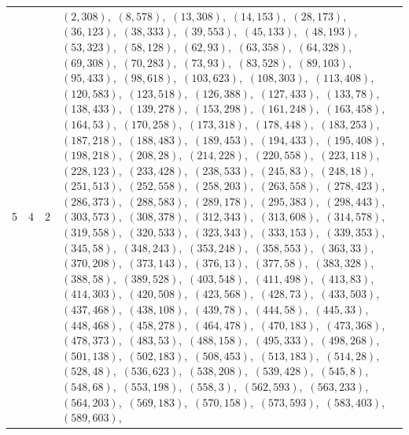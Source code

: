 \documentclass[11pt]{article}
\begin{document}
\begin{longtable}{@{}rrl>{\raggedright\arraybackslash}p{}@{}}
5 & 4 & $2$ & $(2,308)$,\allowbreak\ $(8,578)$,\allowbreak\ $(13,308)$,\allowbreak\ $(14,153)$,\allowbreak\ $(28,173)$,\allowbreak\ $(36,123)$,\allowbreak\ $(38,333)$,\allowbreak\ $(39,553)$,\allowbreak\ $(45,133)$,\allowbreak\ $(48,193)$,\allowbreak\ $(53,323)$,\allowbreak\ $(58,128)$,\allowbreak\ $(62,93)$,\allowbreak\ $(63,358)$,\allowbreak\ $(64,328)$,\allowbreak\ $(69,308)$,\allowbreak\ $(70,283)$,\allowbreak\ $(73,93)$,\allowbreak\ $(83,528)$,\allowbreak\ $(89,103)$,\allowbreak\ $(95,433)$,\allowbreak\ $(98,618)$,\allowbreak\ $(103,623)$,\allowbreak\ $(108,303)$,\allowbreak\ $(113,408)$,\allowbreak\ $(120,583)$,\allowbreak\ $(123,518)$,\allowbreak\ $(126,388)$,\allowbreak\ $(127,433)$,\allowbreak\ $(133,78)$,\allowbreak\ $(138,433)$,\allowbreak\ $(139,278)$,\allowbreak\ $(153,298)$,\allowbreak\ $(161,248)$,\allowbreak\ $(163,458)$,\allowbreak\ $(164,53)$,\allowbreak\ $(170,258)$,\allowbreak\ $(173,318)$,\allowbreak\ $(178,448)$,\allowbreak\ $(183,253)$,\allowbreak\ $(187,218)$,\allowbreak\ $(188,483)$,\allowbreak\ $(189,453)$,\allowbreak\ $(194,433)$,\allowbreak\ $(195,408)$,\allowbreak\ $(198,218)$,\allowbreak\ $(208,28)$,\allowbreak\ $(214,228)$,\allowbreak\ $(220,558)$,\allowbreak\ $(223,118)$,\allowbreak\ $(228,123)$,\allowbreak\ $(233,428)$,\allowbreak\ $(238,533)$,\allowbreak\ $(245,83)$,\allowbreak\ $(248,18)$,\allowbreak\ $(251,513)$,\allowbreak\ $(252,558)$,\allowbreak\ $(258,203)$,\allowbreak\ $(263,558)$,\allowbreak\ $(278,423)$,\allowbreak\ $(286,373)$,\allowbreak\ $(288,583)$,\allowbreak\ $(289,178)$,\allowbreak\ $(295,383)$,\allowbreak\ $(298,443)$,\allowbreak\ $(303,573)$,\allowbreak\ $(308,378)$,\allowbreak\ $(312,343)$,\allowbreak\ $(313,608)$,\allowbreak\ $(314,578)$,\allowbreak\ $(319,558)$,\allowbreak\ $(320,533)$,\allowbreak\ $(323,343)$,\allowbreak\ $(333,153)$,\allowbreak\ $(339,353)$,\allowbreak\ $(345,58)$,\allowbreak\ $(348,243)$,\allowbreak\ $(353,248)$,\allowbreak\ $(358,553)$,\allowbreak\ $(363,33)$,\allowbreak\ $(370,208)$,\allowbreak\ $(373,143)$,\allowbreak\ $(376,13)$,\allowbreak\ $(377,58)$,\allowbreak\ $(383,328)$,\allowbreak\ $(388,58)$,\allowbreak\ $(389,528)$,\allowbreak\ $(403,548)$,\allowbreak\ $(411,498)$,\allowbreak\ $(413,83)$,\allowbreak\ $(414,303)$,\allowbreak\ $(420,508)$,\allowbreak\ $(423,568)$,\allowbreak\ $(428,73)$,\allowbreak\ $(433,503)$,\allowbreak\ $(437,468)$,\allowbreak\ $(438,108)$,\allowbreak\ $(439,78)$,\allowbreak\ $(444,58)$,\allowbreak\ $(445,33)$,\allowbreak\ $(448,468)$,\allowbreak\ $(458,278)$,\allowbreak\ $(464,478)$,\allowbreak\ $(470,183)$,\allowbreak\ $(473,368)$,\allowbreak\ $(478,373)$,\allowbreak\ $(483,53)$,\allowbreak\ $(488,158)$,\allowbreak\ $(495,333)$,\allowbreak\ $(498,268)$,\allowbreak\ $(501,138)$,\allowbreak\ $(502,183)$,\allowbreak\ $(508,453)$,\allowbreak\ $(513,183)$,\allowbreak\ $(514,28)$,\allowbreak\ $(528,48)$,\allowbreak\ $(536,623)$,\allowbreak\ $(538,208)$,\allowbreak\ $(539,428)$,\allowbreak\ $(545,8)$,\allowbreak\ $(548,68)$,\allowbreak\ $(553,198)$,\allowbreak\ $(558,3)$,\allowbreak\ $(562,593)$,\allowbreak\ $(563,233)$,\allowbreak\ $(564,203)$,\allowbreak\ $(569,183)$,\allowbreak\ $(570,158)$,\allowbreak\ $(573,593)$,\allowbreak\ $(583,403)$,\allowbreak\ $(589,603)$,\allowbreak\ 
\end{longtable}
\end{document}
